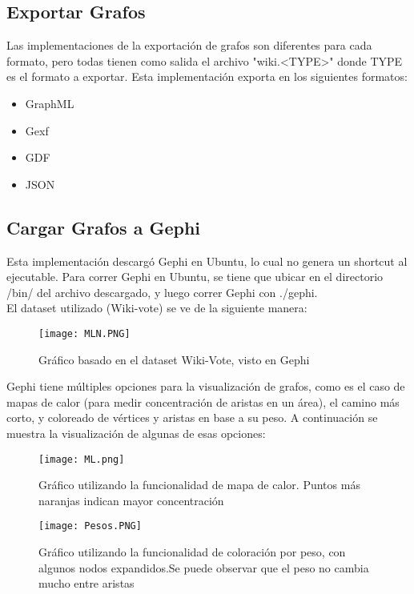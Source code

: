 \documentclass[acmsmall]{acmart}
\begin{document}
\subsection{Exportar Grafos}
Las implementaciones de la exportación de grafos son diferentes para cada formato, pero todas tienen como salida el archivo "wiki.<TYPE>" donde TYPE es el formato a exportar. Esta implementación exporta en los siguientes formatos:
\begin{itemize}
\item GraphML
\item Gexf
\item GDF
\item JSON
\end{itemize}


\subsection{Cargar Grafos a Gephi}
Esta implementación descargó Gephi en Ubuntu, lo cual no genera un shortcut al ejecutable. Para correr Gephi en Ubuntu, se tiene que ubicar en el directorio /bin/ del archivo descargado, y luego correr Gephi con ./gephi.
\\
El dataset utilizado (Wiki-vote) se ve de la siguiente manera:

\begin{figure}[h]
  \centering
  \texttt{[image: MLN.PNG]}
  \caption{Gráfico basado en el dataset Wiki-Vote, visto en Gephi}
\end{figure}

Gephi tiene múltiples opciones para la visualización de grafos, como es el caso de mapas de calor (para medir concentración de aristas en un área), el camino más corto, y coloreado de vértices y aristas en base a su peso. A continuación se muestra la visualización de algunas de esas opciones:

\begin{figure}[h]
  \centering
  \texttt{[image: ML.png]}
  \caption{Gráfico utilizando la funcionalidad de mapa de calor. Puntos más naranjas indican mayor concentración}
\end{figure}


\begin{figure}[h]
  \centering
  \texttt{[image: Pesos.PNG]}
  \caption{Gráfico utilizando la funcionalidad de coloración por peso, con algunos nodos expandidos.Se puede observar que el peso no cambia mucho entre aristas}
\end{figure}
\end{document}
